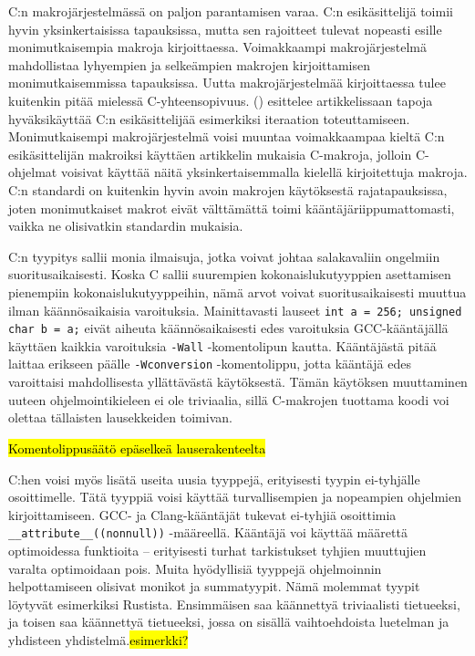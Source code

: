 C:n makrojärjestelmässä on paljon parantamisen varaa. C:n esikäsittelijä toimii
hyvin yksinkertaisissa tapauksissa, mutta sen rajoitteet tulevat nopeasti
esille monimutkaisempia makroja kirjoittaessa. Voimakkaampi makrojärjestelmä
mahdollistaa lyhyempien ja selkeämpien makrojen kirjoittamisen
monimutkaisemmissa tapauksissa. Uutta makrojärjestelmää kirjoittaessa tulee
kuitenkin pitää mielessä C-yhteensopivuus. \citeauthor{cabuse}
(\citeyear{cabuse}) esittelee artikkelissaan tapoja hyväksikäyttää C:n
esikäsittelijää esimerkiksi iteraation toteuttamiseen. Monimutkaisempi
makrojärjestelmä voisi muuntaa voimakkaampaa kieltä C:n esikäsittelijän
makroiksi käyttäen artikkelin mukaisia C-makroja, jolloin C-ohjelmat voisivat
käyttää näitä yksinkertaisemmalla kielellä kirjoitettuja makroja. C:n standardi
on kuitenkin hyvin avoin makrojen käytöksestä rajatapauksissa, joten
monimutkaiset makrot eivät välttämättä toimi kääntäjäriippumattomasti, vaikka
ne olisivatkin standardin mukaisia.

C:n tyypitys sallii monia ilmaisuja, jotka voivat johtaa salakavaliin ongelmiin
suoritusaikaisesti. Koska C sallii suurempien kokonaislukutyyppien asettamisen
pienempiin kokonaislukutyyppeihin, nämä arvot voivat suoritusaikaisesti muuttua
ilman käännösaikaisia varoituksia. Mainittavasti lauseet \texttt{int a = 256;
unsigned char b = a;} eivät aiheuta käännösaikaisesti edes varoituksia
GCC-kääntäjällä käyttäen kaikkia varoituksia \texttt{-Wall} -komentolipun
kautta. Kääntäjästä pitää laittaa erikseen päälle \texttt{-Wconversion}
-komentolippu, jotta kääntäjä edes varoittaisi mahdollisesta yllättävästä
käytöksestä. Tämän käytöksen muuttaminen uuteen ohjelmointikieleen ei ole
triviaalia, sillä C-makrojen tuottama koodi voi olettaa tällaisten lausekkeiden
toimivan.

\hl{Komentolippusäätö epäselkeä lauserakenteelta}

C:hen voisi myös lisätä useita uusia tyyppejä, erityisesti tyypin ei-tyhjälle
osoittimelle. Tätä tyyppiä voisi käyttää turvallisempien ja nopeampien
ohjelmien kirjoittamiseen. GCC- ja Clang-kääntäjät tukevat ei-tyhjiä osoittimia
\texttt{\_\_attribute\_\_((nonnull))} -määreellä. Kääntäjä voi käyttää määrettä
optimoidessa funktioita -- erityisesti turhat tarkistukset tyhjien muuttujien
varalta optimoidaan pois. Muita hyödyllisiä tyyppejä ohjelmoinnin
helpottamiseen olisivat monikot ja summatyypit. Nämä molemmat tyypit löytyvät esimerkiksi Rustista.
Ensimmäisen saa käännettyä triviaalisti tietueeksi, ja toisen saa käännettyä
tietueeksi, jossa on sisällä vaihtoehdoista luetelman ja
yhdisteen yhdistelmä.\hl{esimerkki?}

